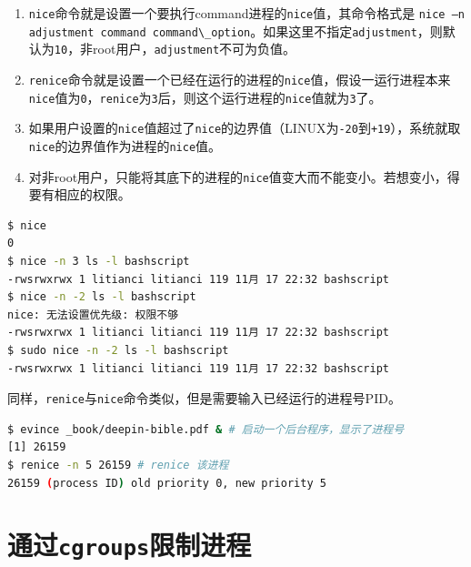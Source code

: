 \documentclass[doctor,openright,twoside]{sjtuthesis}
\providecommand{\tightlist}{%
    \setlength{\itemsep}{0pt}\setlength{\parskip}{0pt}}
\newcommand{\passthrough}[1]{#1}
\theoremstyle{plain}
\theoremstyle{definition}
\theoremstyle{remark}
\theoremstyle{ocrenumbox}
\theoremstyle{plain}
\begin{document}
\begin{enumerate}
\def\labelenumi{\arabic{enumi}.}
\tightlist
\item
  \passthrough{\lstinline!nice!}命令就是设置一个要执行command进程的\passthrough{\lstinline!nice!}值，其命令格式是 \passthrough{\lstinline!nice –n adjustment command command\_option!}。如果这里不指定\passthrough{\lstinline!adjustment!}，则默认为\passthrough{\lstinline!10!}，非root用户，\passthrough{\lstinline!adjustment!}不可为负值。
\item
  \passthrough{\lstinline!renice!}命令就是设置一个已经在运行的进程的\passthrough{\lstinline!nice!}值，假设一运行进程本来\passthrough{\lstinline!nice!}值为\passthrough{\lstinline!0!}，\passthrough{\lstinline!renice!}为\passthrough{\lstinline!3!}后，则这个运行进程的\passthrough{\lstinline!nice!}值就为\passthrough{\lstinline!3!}了。
\item
  如果用户设置的\passthrough{\lstinline!nice!}值超过了\passthrough{\lstinline!nice!}的边界值（LINUX为\passthrough{\lstinline!-20!}到\passthrough{\lstinline!+19!}），系统就取\passthrough{\lstinline!nice!}的边界值作为进程的\passthrough{\lstinline!nice!}值。
\item
  对非root用户，只能将其底下的进程的\passthrough{\lstinline!nice!}值变大而不能变小。若想变小，得要有相应的权限。
\end{enumerate}

\begin{lstlisting}[language=bash]
$ nice
0
$ nice -n 3 ls -l bashscript
-rwsrwxrwx 1 litianci litianci 119 11月 17 22:32 bashscript
$ nice -n -2 ls -l bashscript
nice: 无法设置优先级: 权限不够
-rwsrwxrwx 1 litianci litianci 119 11月 17 22:32 bashscript
$ sudo nice -n -2 ls -l bashscript
-rwsrwxrwx 1 litianci litianci 119 11月 17 22:32 bashscript
\end{lstlisting}

同样，\passthrough{\lstinline!renice!}与\passthrough{\lstinline!nice!}命令类似，但是需要输入已经运行的进程号PID。

\begin{lstlisting}[language=bash]
$ evince _book/deepin-bible.pdf & # 启动一个后台程序，显示了进程号
[1] 26159
$ renice -n 5 26159 # renice 该进程
26159 (process ID) old priority 0, new priority 5
\end{lstlisting}

\hypertarget{cgroups}{%
\section{\texorpdfstring{通过\texttt{cgroups}限制进程}{通过cgroups限制进程}}\label{cgroups}}
\end{document}

